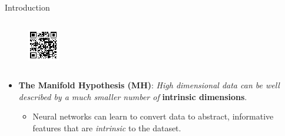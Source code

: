 \documentclass[final,hyperref={pdfpagelabels=false}]{beamer}
\begin{document}
\begin{frame}[t]
\begin{columns}[t]
\begin{column}{.47\textwidth}
\begin{block}{Introduction}
\begin{columns}
\begin{column}{.54\textwidth}
\begin{columns}
    \begin{column}{.25\textwidth} %
    \centering
    \begin{figure}
        \includegraphics[width=0.95\linewidth]{qrcodes/code_topaper.pdf}
    \end{figure}
    \end{column}
    \begin{column}{.05\textwidth}\end{column} %
\end{columns} %

\begin{itemize}
\item \textbf{The Manifold Hypothesis (MH)}: \textit{High dimensional data can be well described by a much smaller number of} \textbf{intrinsic dimensions}.
    \begin{itemize}
    \item Neural networks can learn to convert data to abstract, informative features that are \textit{intrinsic} to the dataset. %
    \end{itemize}

\end{itemize}
\end{column}


\end{columns}
\end{block}
\end{column}
\end{columns}
\end{frame}
\end{document}
